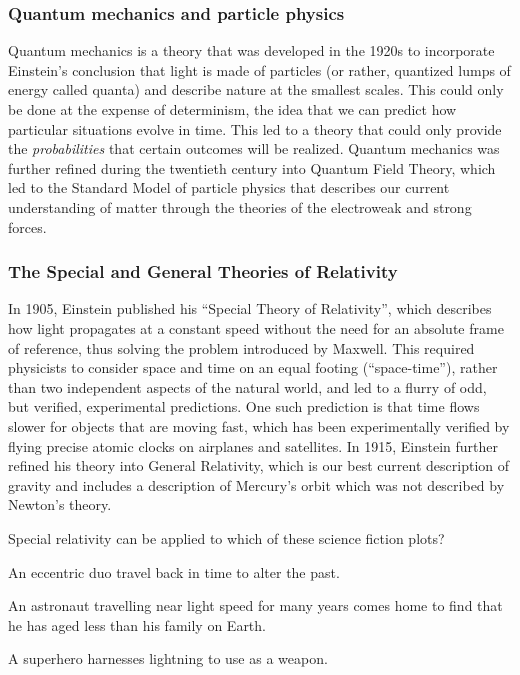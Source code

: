 \subsubsection{Quantum mechanics and particle physics}
Quantum mechanics is a theory that was developed in the 1920s to incorporate Einstein's conclusion that light is made of particles (or rather, quantized lumps of energy called quanta) and describe nature at the smallest scales. This could only be done at the expense of determinism, the idea that we can predict how particular situations evolve in time. This led to a theory that could only provide the \textit{probabilities} that certain outcomes will be realized. Quantum mechanics was further refined during the twentieth century into Quantum Field Theory, which led to the Standard Model of particle physics that describes our current understanding of matter through the theories of the electroweak and strong forces.

\subsubsection{The Special and General Theories of Relativity}
In 1905, Einstein published his ``Special Theory of Relativity'', which describes how light propagates at a constant speed without the need for an absolute frame of reference, thus solving the problem introduced by Maxwell. This required physicists to consider space and time on an equal footing (``space-time''), rather than two independent aspects of the natural world, and led to a flurry of odd, but verified, experimental predictions. One such prediction is that time flows slower for objects that are moving fast, which has been experimentally verified by flying precise atomic clocks on airplanes and satellites. In 1915, Einstein further refined his theory into General Relativity, which is our best current description of gravity and includes a description of Mercury's orbit which was not described by Newton's theory.

\begin{checkpoint}
\begin{MCquestion}{Special relativity can be applied to which of these science fiction plots?}
\item An eccentric duo travel back in time to alter the past. 
\item An astronaut travelling near light speed for many years comes home to find that he has aged less than his family on Earth. \correct
\item A superhero harnesses lightning to use as a weapon.
\end{MCquestion}
\end{checkpoint}

